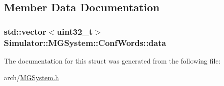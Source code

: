 \subsection{Member Data Documentation}
\hypertarget{struct_simulator_1_1_m_g_system_1_1_conf_words_a18d421080d4d5f2d0602a66a5b985e78}{
\subsubsection[{data}]{\setlength{\rightskip}{0pt plus 5cm}std\+::vector$<$uint32\+\_\+t$>$ Simulator\+::\+M\+G\+System\+::\+Conf\+Words\+::data}}\label{struct_simulator_1_1_m_g_system_1_1_conf_words_a18d421080d4d5f2d0602a66a5b985e78}


The documentation for this struct was generated from the following file\+:\begin{DoxyCompactItemize}
\item 
arch/\hyperlink{_m_g_system_8h}{M\+G\+System.\+h}\end{DoxyCompactItemize}
